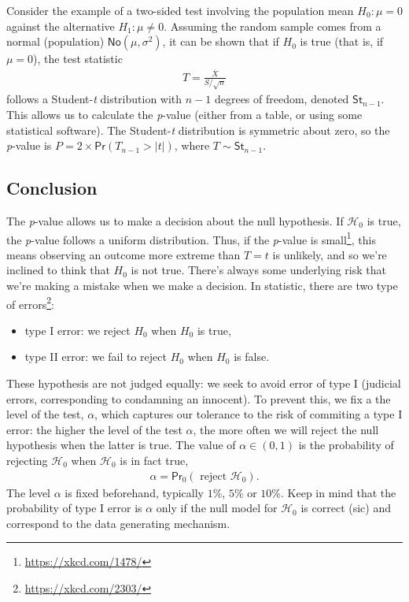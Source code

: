 \documentclass[
  11pt,
  letterpaper,
]{book}
\providecommand{\tightlist}{%
  \setlength{\itemsep}{0pt}\setlength{\parskip}{0pt}}
\renewcommand{\href}[2]{#2\footnote{\url{#1}}}
\theoremstyle{definition}
\theoremstyle{definition}
\theoremstyle{definition}
\theoremstyle{remark}
\begin{document}
Consider the example of a two-sided test involving the population mean \(H_0:\mu=0\) against the alternative \(H_1:\mu \neq 0\). Assuming the random sample comes from a normal (population) \(\mathsf{No}(\mu, \sigma^2)\), it can be shown that if \(H_0\) is true (that is, if \(\mu=0\)), the test statistic
\begin{align*}
T = \frac{\overline{X}}{S/\sqrt{n}}
\end{align*}
follows a Student-\emph{t} distribution with \(n-1\) degrees of freedom, denoted \(\mathsf{St}_{n-1}\). This allows us to calculate the \emph{p}-value (either from a table, or using some statistical software). The Student-\emph{t} distribution is symmetric about zero, so the \emph{p}-value is \(P = 2\times\mathsf{Pr}(T_{n-1} > |t|)\), where \(T \sim \mathsf{St}_{n-1}\).

\hypertarget{conclusion}{%
\subsection{Conclusion}\label{conclusion}}

The \emph{p}-value allows us to make a decision about the null hypothesis. If \(\mathscr{H}_0\) is true, the \emph{p}-value follows a uniform distribution. \href{https://xkcd.com/1478/}{Thus, if the \emph{p}-value is small}, this means observing an outcome more extreme than \(T=t\) is unlikely, and so we're inclined to think that \(H_0\) is not true. There's always some underlying risk that we're making a mistake when we make a decision. In statistic, there are \href{https://xkcd.com/2303/}{two type of errors}:

\begin{itemize}
\tightlist
\item
  type I error: we reject \(H_0\) when \(H_0\) is true,
\item
  type II error: we fail to reject \(H_0\) when \(H_0\) is false.
\end{itemize}

These hypothesis are not judged equally: we seek to avoid error of type I (judicial errors, corresponding to condamning an innocent). To prevent this, we fix a the level of the test, \(\alpha\), which captures our tolerance to the risk of commiting a type I error: the higher the level of the test \(\alpha\), the more often we will reject the null hypothesis when the latter is true. The value of \(\alpha \in (0, 1)\) is the probability of rejecting \(\mathscr{H}_0\) when \(\mathscr{H}_0\) is in fact true,
\begin{align*}
\alpha = \mathsf{Pr}_0\left(\text{ reject } \mathscr{H}_0\right).
\end{align*}
The level \(\alpha\) is fixed beforehand, typically \(1\)\%, \(5\)\% or \(10\)\%. Keep in mind that the probability of type I error is \(\alpha\) only if the null model for \(\mathscr{H}_0\) is correct (sic) and correspond to the data generating mechanism.
\end{document}
